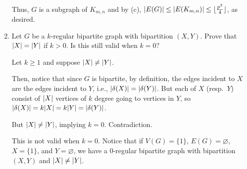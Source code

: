 \begin{enumerate}
\begin{sol}
          Thus, $G$ is a subgraph of $K_{m,n}$
          and by (c), $\abs{E(G)} \leq \abs{E(K_{m,n})} \leq \lfloor\frac{p^2}{4}\rfloor$, as desired.
        \end{sol}
  \item Let $G$ be a $k$-regular bipartite graph with bipartition $(X,Y)$.
        Prove that $\abs{X} = \abs{Y}$ if $k > 0$.
        Is this still valid when $k=0$?
        \begin{prf}
          Let $k \geq 1$ and suppose $\abs{X} \neq \abs{Y}$.

          Then, notice that since $G$ is bipartite, by definition,
          the edges incident to $X$ are the edges incident to $Y$,
          i.e., $\abs{\delta(X)} = \abs{\delta(Y)}$.
          But each of $X$ (resp.\ $Y$) consist of $\abs{X}$
          vertices of $k$ degree going to vertices in $Y$,
          so $\abs{\delta(X)} = k\abs{X} = k\abs{Y} = \abs{\delta(Y)}$.

          But $\abs{X} \neq \abs{Y}$, implying $k = 0$. Contradiction.

          This is not valid when $k=0$.
          Notice that if $V(G) = \{1\}$, $E(G) = \varnothing$,
          $X = \{1\}$, and $Y = \varnothing$,
          we have a 0-regular bipartite graph with bipartition $(X,Y)$
          and $\abs{X} \neq \abs{Y}$.
        \end{prf}
\end{enumerate}

